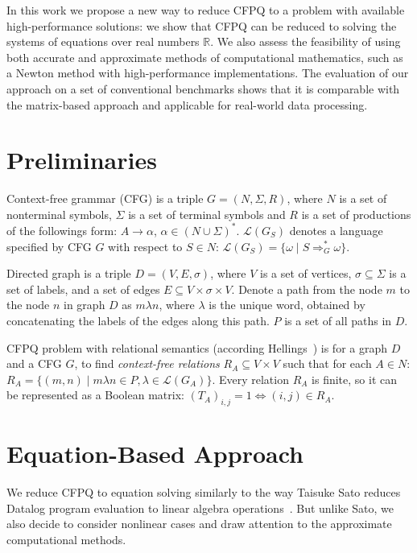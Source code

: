 \documentclass[sigconf]{acmart}
\begin{document}
In this work we propose a new way to reduce CFPQ to a problem with available high-performance solutions: we show that CFPQ can be reduced to solving the systems of equations over real numbers $\mathbb{R}$.
We also assess the feasibility of using both accurate and approximate methods of computational mathematics, such as a Newton method with high-performance implementations.
The evaluation of our approach on a set of conventional benchmarks shows that it is comparable with the matrix-based approach and applicable for real-world data processing.

\section{Preliminaries}

Context-free grammar (CFG) is a triple $G=(N, \Sigma, R)$, where $N$ is a set of nonterminal symbols, $\Sigma$ is a set of terminal symbols and $R$ is a set of productions of the followings form: $A \to \alpha$, $\alpha \in (N \cup \Sigma)^*$.
$\mathcal{L}(G_S)$ denotes a language specified by CFG $G$ with respect to $S \in N$: $\mathcal{L}(G_S) = \{\omega \mid S \Rightarrow_{G}^{*} \omega\}$.

Directed graph is a triple $D = (V,E,\sigma)$, where $V$ is a set of vertices, $\sigma \subseteq \Sigma$ is a set of labels, and a set of edges $E\subseteq V\times \sigma \times V$.
Denote a path from the node $m$ to the node $n$ in graph $D$ as $m\lambda n$, where
$\lambda$ is the unique word, obtained by concatenating the labels of the edges along this path.
$P$ is a set of all paths in $D$.

CFPQ problem with relational semantics (according Hellings~\cite{hellings2014conjunctive}) is for a graph $D$ and a CFG $G$, to find \emph{context-free relations} $R_A \subseteq V \times V$ such that for each $A \in N$: $R_A = \{(m, n) \mid m\lambda n \in P, \lambda \in \mathcal{L}(G_A)\}.$
Every relation $R_A$ is finite, so it can be represented as a Boolean matrix: $(T_A)_{i,j} = 1 \iff (i,j) \in R_A$.

\section{Equation-Based Approach}

We reduce CFPQ to equation solving similarly to the way Taisuke Sato reduces Datalog program evaluation to linear algebra operations~\cite{sato2017linear}.
But unlike Sato, we also decide to consider nonlinear cases and draw attention to the approximate computational methods.
\end{document}
